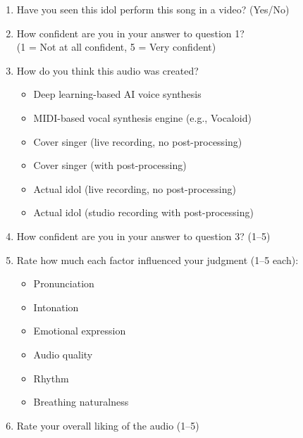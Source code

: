 \documentclass[12pt, a4paper]{article}
\begin{document}
\begin{enumerate}
    \item Have you seen this idol perform this song in a video? (Yes/No)
    \item How confident are you in your answer to question 1? \\
    (1 = Not at all confident, 5 = Very confident)
    \item How do you think this audio was created?
    \begin{itemize}
        \item[(1)] Deep learning-based AI voice synthesis
        \item[(2)] MIDI-based vocal synthesis engine (e.g., Vocaloid)
        \item[(3)] Cover singer (live recording, no post-processing)
        \item[(4)] Cover singer (with post-processing)
        \item[(5)] Actual idol (live recording, no post-processing)
        \item[(6)] Actual idol (studio recording with post-processing)
    \end{itemize}
    \item How confident are you in your answer to question 3? (1--5)
    \item Rate how much each factor influenced your judgment (1--5 each):
    \begin{itemize}
        \item Pronunciation
        \item Intonation
        \item Emotional expression
        \item Audio quality
        \item Rhythm
        \item Breathing naturalness
    \end{itemize}
    \item Rate your overall liking of the audio (1--5)
\end{enumerate}
\end{document}
